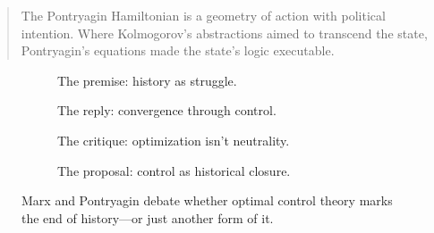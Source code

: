 \begin{quote}
The Pontryagin Hamiltonian is a geometry of action with political intention. Where Kolmogorov’s abstractions aimed to transcend the state, Pontryagin’s equations made the state's logic executable.
\end{quote}

\begin{figure}[H]
\centering

\begin{subfigure}[t]{0.45\textwidth}
\centering
{}
\caption*{The premise: history as struggle.}
\end{subfigure}
\hfill
\begin{subfigure}[t]{0.45\textwidth}
\centering
{}
\caption*{The reply: convergence through control.}
\end{subfigure}

\vspace{1em}

\begin{subfigure}[t]{0.45\textwidth}
\centering
{}
\caption*{The critique: optimization isn’t neutrality.}
\end{subfigure}
\hfill
\begin{subfigure}[t]{0.45\textwidth}
\centering
{}
\caption*{The proposal: control as historical closure.}
\end{subfigure}

\caption{Marx and Pontryagin debate whether optimal control theory marks the end of history—or just another form of it.}
\end{figure}